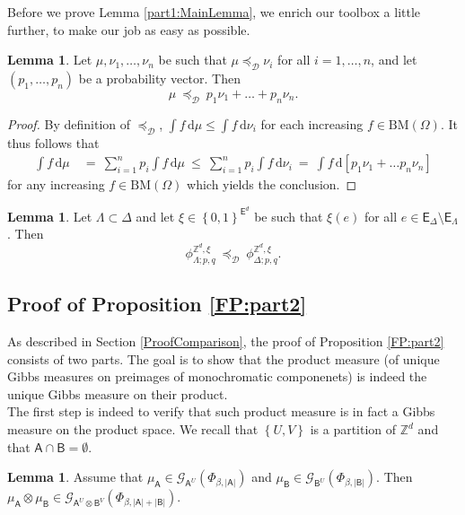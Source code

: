 \documentclass[12pt]{article}
\renewcommand{\AA}{\mathsf{A}}
\newcommand{\AB}{\mathsf{B}}
\newcommand{\D}{\mathcal{D}}
\renewcommand{\d}{\mathrm{d}}
\newcommand{\E}{\mathsf{E}}
\newcommand{\G}{\mathcal{G}}
\newcommand{\Z}{\mathbb{Z}}
\newcommand{\BM}{\mathrm{BM}}
\newcommand{\set}[1]{\left\{#1\right\}}
\newcommand{\1}{\mathbbm{1}}
\newcommand{\5}{\vspace{0.5cm}}
\theoremstyle{definition}
\newtheorem{lem}[thm]{Lemma}
\begin{document}
Before we prove Lemma \ref{part1:MainLemma}, we enrich our toolbox a little further, to make our job as easy as possible.

\begin{lem}\label{Part1:Lemma1}
Let $\mu,\nu_1,\ldots,\nu_n$ be such that $\mu\preceq_\D\nu_i$ for all $i=1,\ldots,n$, and let $(p_1,\ldots,p_n)$ be a probability vector. Then
$$\mu ~\preceq_\D~ p_1\nu_1+\ldots+p_n\nu_n.$$
\end{lem}
\begin{proof}
By definition of $\preceq_\D$, $\int f\,\d\mu\leq\int f\,\d\nu_i$ for each increasing $f\in\BM(\Omega)$. It thus follows that
\begin{align*}
\int f\,\d\mu ~&=~ \sum_{i=1}^n p_i\int f\,\d\mu ~\leq~ \sum_{i=1}^n p_i\int f\,\d\nu_i ~=~ \int f\,\d[p_1\nu_1+\ldots p_n\nu_n]
\end{align*}
for any increasing $f\in\BM(\Omega)$ which yields the conclusion.
\end{proof}

\begin{lem}\label{Part1:Lemma2}
Let $\Lambda\subset\Delta$ and let $\xi\in\set{0,1}^{\E^d}$ be such that $\xi(e)$ for all $e\in\E_\Delta\setminus\E_\Lambda$. Then
$$\phi_{\Lambda;p,q}^{\Z^d,\xi} ~\preceq_\D~ \phi_{\Delta;p,q}^{\Z^d,\xi}.$$
\end{lem}

\pagebreak


\subsection{Proof of Proposition \ref{FP:part2}}

As described in Section \ref{ProofComparison}, the proof of Proposition \ref{FP:part2} consists of two parts. The goal is to show that the product measure (of unique Gibbs measures on preimages of monochromatic componenets) is indeed the unique Gibbs measure on their product. \\

The first step is indeed to verify that such product measure is in fact a Gibbs measure on the product space. We recall that $\set{U,V}$ is a partition of $\Z^d$ and that $\AA\cap\AB=\emptyset$. 

\begin{lem}
Assume that $\mu_\AA\in\G_{\AA^U}(\Phi_{\beta,|\AA|})$ and $\mu_\AB\in\G_{\AB^U}(\Phi_{\beta,|\AB|})$. Then $\mu_\AA\otimes\mu_\AB\in\G_{\AA^U\otimes\AB^V}(\Phi_{\beta,|\AA|+|\AB|})$.
\end{lem}
\end{document}
